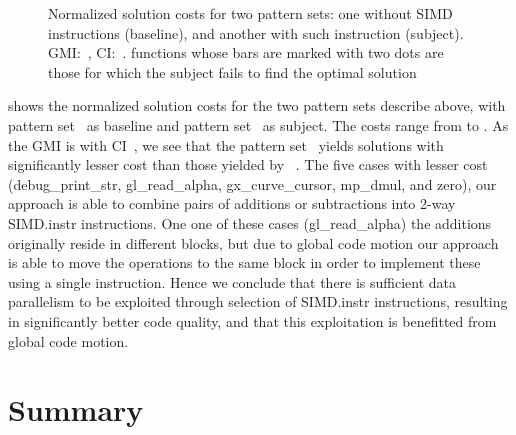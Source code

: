

\begin{figure}
  \centering%
  \maxsizebox{\textwidth}{!}{%
    \trimBarchartPlot{%
    }%
  }

  \caption[Plot for evaluating the impact on SIMD instructions on code quality]%
          {%
            Normalized solution costs for two pattern sets: one without SIMD
            instructions (baseline), and another with such instruction
            (subject).
            GMI:~\printGMI{%
              \SimdVsWithoutCyclesSpeedupCyclesRegularSpeedupGmean%
            },
            CI:~\printGMICI{%
              \SimdVsWithoutCyclesSpeedupCyclesRegularSpeedupCiMin%
            }{%
              \SimdVsWithoutCyclesSpeedupCyclesRegularSpeedupCiMax%
            }.
            \Glspl{function} whose bars are marked with two dots are those
            for which the \gls{subject} fails to find the optimal solution%
          }
\end{figure}

 shows the normalized \gls{solution}
costs for the two \glspl{pattern set} describe above, with \gls{pattern
  set}~\patternSetA{} as \gls{baseline} and \gls{pattern set}~\patternSetB{} as
\gls{subject}.
%
The costs range from
\printMinCycles{%
  \SimdVsWithoutCyclesSpeedupCyclesAvgMin,
  \SimdVsWithoutCyclesSpeedupBaselineCyclesAvgMin
}to
\printMaxCycles{%
  \SimdVsWithoutCyclesSpeedupCyclesAvgMax,
  \SimdVsWithoutCyclesSpeedupBaselineCyclesAvgMax
}.
%
As the \gls{GMI} is \printGMI{%
  \SimdVsWithoutCyclesSpeedupCyclesRegularSpeedupGmean%
} with \gls{CI}~\printGMICI{%
  \SimdVsWithoutCyclesSpeedupCyclesRegularSpeedupCiMin%
}{%
  \SimdVsWithoutCyclesSpeedupCyclesRegularSpeedupCiMax%
}, we see that the \gls{pattern set}~\patternSetB{} yields \glspl{solution} with
significantly lesser cost than those yielded by ~\patternSetA.
%
The five cases with lesser cost ({\codeFont debug\_print\_str}, {\codeFont
  gl\_read\_alpha}, {\codeFont gx\_curve\_cursor}, {\codeFont mp\_dmul}, and
{\codeFont zero}), our approach is able to combine pairs of additions or
subtractions into \num{2}-way \gls{SIMD.instr} \glspl{instruction}.
%
One one of these cases ({\codeFont gl\_read\_alpha}) the additions originally
reside in different \glspl{block}, but due to \gls{global code motion} our
approach is able to move the operations to the same block in order to implement
these using a single \gls{instruction}.
%
Hence we conclude that there is sufficient data parallelism to be exploited
through selection of \gls{SIMD.instr} \glspl{instruction}, resulting in
significantly better code quality, and that this exploitation is benefitted from
\gls{global code motion}.


\section{Summary}


